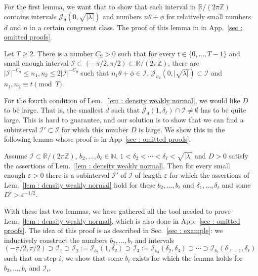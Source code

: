 \documentclass[a4paper,UKenglish,cleveref, autoref, thm-restate]{lipics-v2021}
\begin{document}
For the first lemma, we want that to show that each interval in $\mathbb{R}/(2\pi\mathbb{Z})$ contains intervals $\mathcal{J}_d(0, \sqrt{|\lambda|})$ and numbers $n\theta + \phi$ for relatively small numbers $d$ and $n$ in a certain congruent class.
The proof of this lemma in in App.~\ref{sec : omitted proofs}.

\begin{lemma}\label{lem : smallest n in interval}
    Let $T \ge 2$.
    There is a number $C_9 > 0$ such that for every $t \in \{0,\dots, T-1\}$ and small enough interval $\mathcal{I} \subset (-\pi/2, \pi/2) \subset \mathbb{R}/(2\pi\mathbb{Z})$, there are $|\mathcal{I}|^{-C_9} \le n_1, n_2 \le 2|\mathcal{I}|^{-C_9}$ such that $n_1 \theta + \phi \in \mathcal{I}$, $\mathcal{J}_{n_2}(0, |\sqrt{\lambda|}) \subset \mathcal{I}$ and $n_1, n_2 \equiv t\pmod T$.
\end{lemma}

For the fourth condition of Lem.~\ref{lem : density weakly normal}, we would like $D$ to be large. 
That is, the smallest $d$ such that $\mathcal{J}_d(1, \delta_\ell) \cap \mathcal{I}\ne\emptyset$ has to be quite large.
This is hard to guarantee, and our solution is to show that we can find a subinterval $\mathcal{I}' \subset \mathcal{I}$ for which this number $D$ is large. 
We show this in the following lemma whose proof is in App~\ref{sec : omitted proofs}.
\begin{lemma}\label{lem : better subintervals}
    Assume $\mathcal{I} \subset \mathbb{R}/(2\pi\mathbb{Z})$, $b_2,\dots,b_\ell \in \mathbb{N}$, $1< \delta_2 < \cdots < \delta_\ell <\sqrt{|\lambda|}$ and $D > 0$ satisfy the assertions of Lem.~\ref{lem : density weakly normal}.
    Then for every small enough $\varepsilon > 0$ there is a subinterval $\mathcal{I}'$ of $\mathcal{I}$ of length $\varepsilon$ for which the assertions of Lem.~\ref{lem : density weakly normal} hold for these $b_2,\dots,b_\ell$ and $\delta_1,\dots,\delta_\ell$ and some $D' > \varepsilon^{-1/2}$.
  \end{lemma}
  
With these last two lemmas, we have gathered all the tool needed to prove Lem.~\ref{lem : density weakly normal}, which is also done in App.~\ref{sec : omitted proofs}.
The idea of this proof is as described in Sec.~\ref{sec : example}:
we inductively construct the numbers $b_2,\dots,b_\ell$ and intervals 
\begin{equation*}
(-\pi/2,\pi/2) \supset \mathcal{I}_1 \supset \mathcal{I}_2 := \mathcal{I}_{b_2}(1,\delta_2) \supset \mathcal{I}_3 := \mathcal{I}_{b_3}(\delta_2,\delta_3) \supset \cdots \supset \mathcal{I}_{b_\ell}(\delta_{\ell-1},\delta_\ell)
\end{equation*}
such that on step $i$, we show that some $b_i$ exists for which the lemma holds for $b_2,\dots,b_i$ and $\mathcal{I}_i$. 
\end{document}
